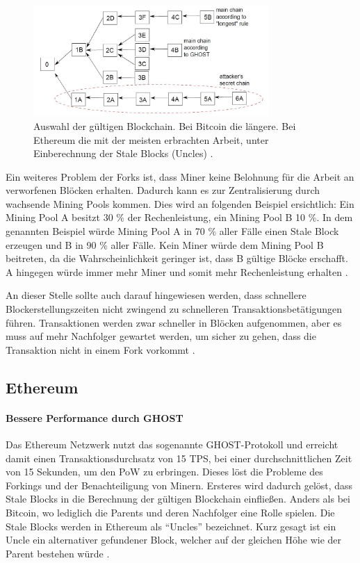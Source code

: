 \begin{figure}[!htbp]
  \centering
    \includegraphics[width=0.8\textwidth,angle=0]{images/forking-risks}
     \caption{Auswahl der gültigen Blockchain. Bei Bitcoin die längere. Bei Ethereum die mit der meisten erbrachten Arbeit, unter Einberechnung der Stale Blocks (Uncles) \cite{SompolinskyAcceleratingBitcoinTransaction2013}.}
    \label{fig:forking-risks}
\end{figure} 

Ein weiteres Problem der Forks ist, dass Miner keine Belohnung für die Arbeit an verworfenen Blöcken erhalten. Dadurch kann es zur Zentralisierung durch wachsende Mining Pools kommen. Dies wird an folgenden Beispiel ersichtlich: Ein Mining Pool A besitzt 30 \% der Rechenleistung, ein Mining Pool B 10 \%. In dem genannten Beispiel würde Mining Pool A in 70 \% aller Fälle einen Stale Block erzeugen und B in 90 \% aller Fälle. Kein Miner würde dem Mining Pool B beitreten, da die Wahrscheinlichkeit geringer ist, dass B gültige Blöcke erschafft. A hingegen würde immer mehr Miner und somit mehr Rechenleistung erhalten \cite{EthereumTeamEthereumWhitePaper2017}.

An dieser Stelle sollte auch darauf hingewiesen werden, dass schnellere Blockerstellungszeiten nicht zwingend zu schnelleren Transaktionsbetätigungen führen. Transaktionen werden zwar schneller in Blöcken aufgenommen, aber es muss auf mehr Nachfolger gewartet werden, um sicher zu gehen, dass die Transaktion nicht in einem Fork vorkommt \cite{SchererPerformanceScalabilityBlockchain2017}.

\subsection{Ethereum}

\paragraph{Bessere Performance durch GHOST}
Das Ethereum Netzwerk nutzt das sogenannte GHOST-Protokoll und erreicht damit einen Transaktionsdurchsatz von 15 \acs{TPS}, bei einer durchschnittlichen Zeit von 15 Sekunden, um den \acs{PoW} zu erbringen. Dieses löst die Probleme des Forkings und der Benachteiligung von Minern. Ersteres wird dadurch gelöst, dass Stale Blocks in die Berechnung der gültigen Blockchain einfließen. Anders als bei Bitcoin, wo lediglich die Parents und deren Nachfolger eine Rolle spielen. Die Stale Blocks werden in Ethereum als ``Uncles'' bezeichnet. Kurz gesagt ist ein Uncle ein alternativer gefundener Block, welcher auf der gleichen Höhe wie der Parent bestehen würde \cite{EthereumTeamEthereumWhitePaper2017}.

